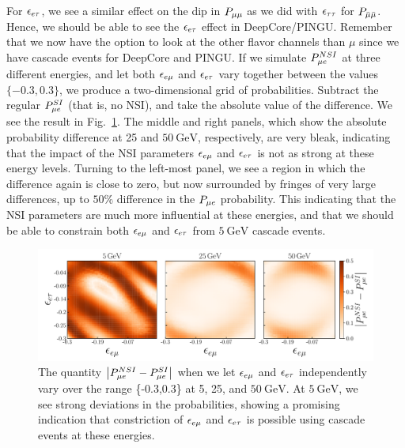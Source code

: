 For $\epsilon_{e\tau}$, we see a similar effect on the dip in $P_{\mu\mu}$ as we did with $\epsilon_{\tau\tau}$ for $P_{\bar{\mu} \bar{\mu}}$. Hence, we should be able to 
see the $\epsilon_{e\tau}$ effect in DeepCore/PINGU. Remember that we now have the option to look at the other flavor channels than $\mu$ since we 
have cascade events for DeepCore and PINGU. If we simulate 
$P_{\mu e}^{NSI}$ at three different energies, and let both $\epsilon_{e\mu}$ and $\epsilon_{e\tau}$ vary together between the values $\{-0.3,0.3\}$, we produce a two-dimensional grid of probabilities.
Subtract the regular $P_{\mu e}^{SI}$ (that is, no NSI), and take the absolute value of the difference. We see the result in Fig.~\ref{fig:eem_eet_prob}. 
The middle and right panels, which show the absolute probability difference at \si{25} and $\SI{50}{\GeV}$, respectively, are very bleak,
indicating that the impact of the NSI parameters $\epsilon_{e\mu}$ and $\epsilon_{e\tau}$ is not as strong at these energy levels. Turning to the left-most panel,
we see a region in which the difference again is close to zero, but now surrounded by fringes of very large differences, up to $50\%$ difference 
in the $P_{\mu e}$ probability. This indicating that the NSI parameters are much more influential at these energies, and that we should be able to 
constrain both $\epsilon_{e\mu}$ and $\epsilon_{e\tau}$ from $\SI{5}{\GeV}$ cascade events.

\begin{figure}
    \centering
    \includegraphics[width=1\textwidth]{figures/eem_eet_prob.pdf}
    \caption{The quantity $\abs{P_{\mu e}^{NSI} - P_{\mu e}^{SI}}$ when we let $\epsilon_{e\mu}$ and $\epsilon_{e\tau}$ independently vary over
    the range \{-0.3,0.3\} at \si{5}, \si{25}, and $\SI{50}{\GeV}$. At $\SI{5}{\GeV}$, we see strong deviations in the probabilities, showing
    a promising indication that constriction of $\epsilon_{e\mu}$ and $\epsilon_{e\tau}$ is possible using cascade events at these energies.}\label{fig:eem_eet_prob}
\end{figure}


